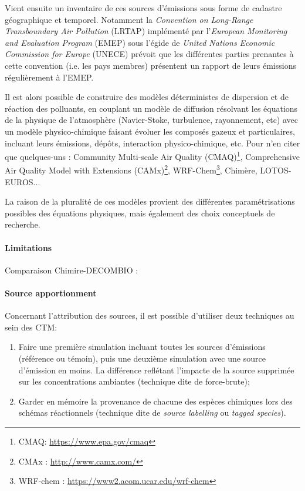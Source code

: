 Vient ensuite un inventaire de ces sources d'émissions sous forme de cadastre géographique
et temporel. Notamment la \textit{Convention on Long-Range Transboundary Air
Pollution} (LRTAP) implémenté par l'\textit{European Monitoring and Evaluation Program}
(EMEP) sous l'égide de \textit{United Nations Economic Commission for Europe} (UNECE)
prévoit que les différentes parties prenantes à cette convention (i.e. les pays membres)
présentent un rapport de leurs émissions régulièrement à l'EMEP.

Il est alors possible de construire des modèles déterministes de dispersion et de
réaction des polluants, en couplant un modèle de diffusion résolvant les équations de la
physique de l'atmosphère (Navier-Stoke, turbulence, rayonnement, etc) avec un modèle
physico-chimique faisant évoluer les composés gazeux et particulaires, incluant leurs
émissions, dépôts, interaction physico-chimique, etc. Pour n'en citer que quelques-uns : 
Community Multi-scale Air Quality (CMAQ)\footnote{CMAQ: \url{https://www.epa.gov/cmaq}},
Comprehensive Air Quality Model with Extensions (CAMx)\footnote{CMAx : \url{http://www.camx.com/}},
WRF-Chem\footnote{WRF-chem : \url{https://www2.acom.ucar.edu/wrf-chem}},
Chimère,
LOTOS-EUROS...

La raison de la pluralité de ces modèles provient des différentes paramétrisations
possibles des équations physiques, mais également des choix conceptuels de recherche.

\paragraph{Limitations}%
\label{par:limitations}

Comparaison Chimire-DECOMBIO : \cite{bessagnetHigh2020}

\paragraph{Source apportionment}%
\label{par:source_apportionment}

Concernant l'attribution des sources, il est possible d'utiliser deux techniques au sein
des CTM:

\begin{enumerate}
    \item Faire une première simulation incluant toutes les sources d'émissions (référence
        ou témoin), puis une deuxième simulation avec une source d'émission en moins. La
        différence reflétant l'impacte de la source supprimée sur les concentrations
        ambiantes (technique dite de force-brute);
    \item Garder en mémoire la provenance de chacune des espèces chimiques lors des
        schémas réactionnels (technique dite de \textit{source labelling} ou \textit{tagged species}).
\end{enumerate}


